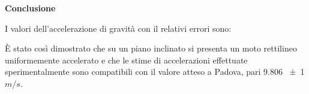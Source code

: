 \documentclass[a4paper,11pt,titlepage]{book}
\begin{document}
\newpage



\begin{center}
\begin{large}
\textbf{Conclusione}
\end{large}
\end{center}


\begin{flushleft}
I valori dell’accelerazione di gravità con il relativi errori sono:
\end{flushleft}

\begin{figure}[h!]
\end{figure}

\vspace{1cm}

\begin{figure}[h!]
\end{figure}



\vspace{1cm}
\begin{flushleft}
È stato così dimostrato che su un piano inclinato si presenta un moto rettilineo uniformemente accelerato e che le stime di accelerazioni effettuate sperimentalmente sono compatibili con il valore atteso a Padova, pari 9.806 \SI{\pm 1}{} $m/s$.

\end{flushleft}
\end{document}
